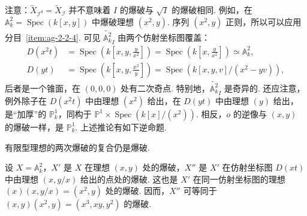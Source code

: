 注意：$\widetilde X_{\mathcal I^d}=\widetilde X_{\mathcal I}$ 并不意味着 $I$ 的爆破与 $\sqrt I$ 的爆破相同. 例如，在 $\mathbb A_k^2=\operatorname{Spec}(k[x,y])$ 中爆破理想 $(x^2,y)$. 序列 $(x^2,y)$ 正则，所以可以应用分目~\ref{item:ag-2-2-4}. 可见 $\widetilde{\mathbb A_k^2}_I$ 由两个仿射坐标图覆盖：
\begin{align*}
D(x^2t)&=\operatorname{Spec}\left(k\left[x,y,\frac y{x^2}\right]\right)=\operatorname{Spec}\left(k\left[x,\frac y{x^2}\right]\right)\simeq\mathbb A_k^2,\\
D(yt)&=\operatorname{Spec}\left(k\left[x,y,\frac{x^2}y\right]\right)=\operatorname{Spec}(k[x,y,v]/(x^2-yv)),
\end{align*}
后者是一个锥面，在 $(0,0,0)$ 处有二次奇点. 特别地，$\widetilde{\mathbb A_k^2}_I$ 是奇异的. 还应注意，例外除子在 $D(x^2t)$ 中由理想 $(x^2)$ 给出，在 $D(yt)$ 中由理想 $(y)$ 给出，是``加厚''的 $\mathbb P_k^1$，同构于 $\mathbb P^1\times\operatorname{Spec}(k[x]/(x^2))$. 相反，$o$ 的逆像与 $(x,y)$ 的爆破一样，是 $\mathbb P_k^1$.
上述推论有如下逆命题.
\begin{proposition}\label{item:ag-2-2-14}
有限型理想的两次爆破的复合仍是爆破.
\end{proposition}
\begin{example*}
设 $X=\mathbb A_k^2$，$X'$ 是 $X$ 在理想 $(x,y)$ 处的爆破，$X''$ 是 $X'$ 在仿射坐标图 $D(xt)$ 中由理想 $(x,y/x)$ 给出的点处的爆破. 这也是 $X'$ 在同一仿射坐标图的理想 $(x)(x,y/x)=(x^2,y)$ 处的爆破. 因而，$X''$ 可等同于 $(x,y)(x^2,y)=(x^3,xy,y^2)$ 的爆破.
\end{example*}
